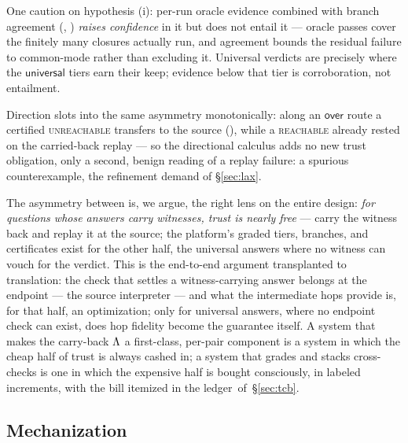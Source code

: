 One caution on hypothesis (i): per-run oracle evidence combined with
branch agreement (, ) \emph{raises
confidence} in it but does not entail it --- oracle passes cover the
finitely many closures actually run, and agreement bounds the residual
failure to common-mode rather than excluding it. Universal verdicts are
precisely where the $\mathsf{universal}$ tiers earn their keep; evidence
below that tier is corroboration, not entailment.

\ifarxiv
Direction slots into the same asymmetry monotonically: along an
$\mathsf{over}$ route a certified \textsc{unreachable} transfers to the
source (), while a \textsc{reachable} already rested on
the carried-back replay --- so the directional calculus adds no new
trust obligation, only a second, benign reading of a replay failure:
a spurious counterexample, the refinement demand of \S\ref{sec:lax}.
\fi

The asymmetry between  is, we argue,
the right lens on the entire design: \emph{for questions whose answers
carry witnesses, trust is nearly free} --- carry the witness back and
replay it at the source; the platform's graded tiers, branches, and
certificates exist for the other half, the universal answers where no
witness can vouch for the verdict. This is the end-to-end argument
\citep{saltzer1984endtoend} transplanted to translation: the check that
settles a witness-carrying answer belongs at the endpoint --- the
source interpreter --- and what the intermediate hops provide is, for
that half, an optimization; only for universal answers, where no
endpoint check can exist, does hop fidelity become the guarantee
itself. A system that makes the carry-back
$\Lambda$ a first-class, per-pair component is a system in which the cheap
half of trust is always cashed in; a system that grades and stacks
cross-checks is one in which the expensive half is bought consciously,
in labeled increments, with the bill itemized in the
ledger~of~\S\ref{sec:tcb}.

\subsection{Mechanization}
\label{sec:mech}

